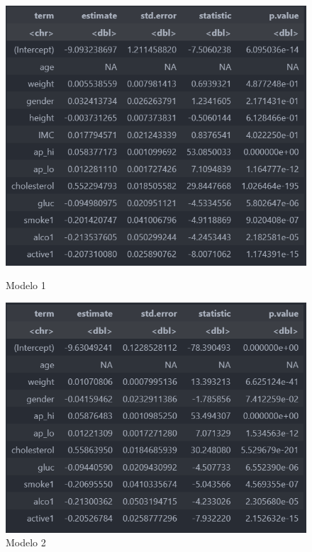 \documentclass[article,11pt,a4paper,brazil]{abntex2}
\begin{document}
	\begin{figure}[H]
		\centering
		\begin{minipage}[b]{0.4\textwidth}
			\includegraphics[width=\textwidth]{Images/pvalue1.png}
			\caption{Modelo 1}
		\end{minipage}
		\hspace{2mm}
		\begin{minipage}[b]{0.4\textwidth}
			\includegraphics[width=\textwidth]{Images/pvalue2.png}
			\caption{Modelo 2}
		\end{minipage}
	\end{figure}
\end{document}

